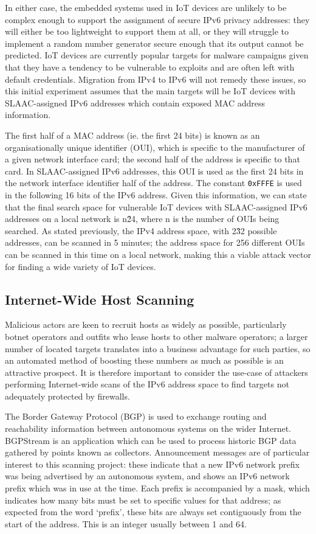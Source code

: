 \documentclass[10pt,sigconf]{acmart}
\begin{document}
In either case, the embedded systems used in IoT devices are unlikely to be complex enough to support the assignment of secure IPv6 privacy addresses:
they will either be too lightweight to support them at all, or they will struggle to implement a random number generator secure enough that its output cannot be predicted.
IoT devices are currently popular targets for malware campaigns given that they have a tendency to be vulnerable to exploits and are often left with default credentials.
Migration from IPv4 to IPv6 will not remedy these issues, so this initial experiment assumes that the main targets will be IoT devices with SLAAC-assigned IPv6 addresses which contain exposed MAC address information.

The first half of a MAC address (ie. the first 24 bits) is known as an organisationally unique identifier (OUI), which is specific to the manufacturer of a given network interface card;
the second half of the address is specific to that card.
In SLAAC-assigned IPv6 addresses, this OUI is used as the first 24 bits in the network interface identifier half of the address.
The constant \texttt{0xFFFE} is used in the following 16 bits of the IPv6 address.
Given this information, we can state that the final search space for vulnerable IoT devices with SLAAC-assigned IPv6 addresses on a local network is n\^24, where n is the number of OUIs being searched.
As stated previously, the IPv4 address space, with 2\^32 possible addresses, can be scanned in 5 minutes;
the address space for 256 different OUIs can be scanned in this time on a local network, making this a viable attack vector for finding a wide variety of IoT devices.

\subsection{Internet-Wide Host Scanning}
Malicious actors are keen to recruit hosts as widely as possible, particularly botnet operators and outfits who lease hosts to other malware operators;
a larger number of located targets translates into a business advantage for such parties, so an automated method of boosting these numbers as much as possible is an attractive prospect.
It is therefore important to consider the use-case of attackers performing Internet-wide scans of the IPv6 address space to find targets not adequately protected by firewalls.

The Border Gateway Protocol (BGP) is used to exchange routing and reachability information between autonomous systems on the wider Internet.
BGPStream is an application which can be used to process historic BGP data gathered by points known as collectors.
Announcement messages are of particular interest to this scanning project:
these indicate that a new IPv6 network prefix was being advertised by an autonomous system, and shows an IPv6 network prefix which was in use at the time.
Each prefix is accompanied by a mask, which indicates how many bits must be set to specific values for that address;
as expected from the word `prefix', these bits are always set contiguously from the start of the address.
This is an integer usually between 1 and 64.
\end{document}
